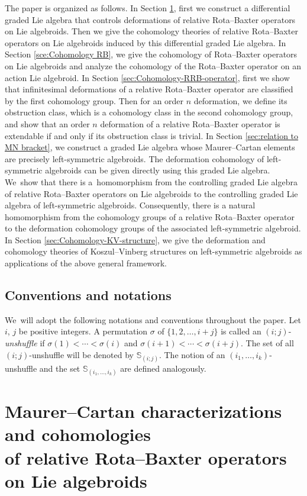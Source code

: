 \documentclass[pdftex]{sigma}%
\numberwithin{equation}{section}
\begin{document}
The paper is organized as follows.
In Section \ref{sec:MC-RRB-operator}, first we construct a differential graded Lie algebra that controls deformations of relative Rota--Baxter operators on Lie algebroids. Then we give the cohomology theories of relative Rota--Baxter operators on Lie algebroids induced by this differential graded Lie algebra. In Section \ref{sce:Cohomology RB}, we give the cohomology of Rota--Baxter operators on Lie algebroids and analyze the cohomology of the Rota--Baxter operator on an action Lie algebroid. In Section \ref{sec:Cohomology-RRB-operator}, first we show that infinitesimal deformations of a relative Rota--Baxter operator are classified by the first cohomology group. Then for an order $n$ deformation, we define its obstruction class, which is a cohomology class in the second cohomology group, and show that an order $n$ deformation of a relative Rota--Baxter operator is extendable if and only if its obstruction class is trivial.
In Section \ref{sec:relation to MN bracket}, we construct a graded Lie algebra whose Maurer--Cartan elements are precisely left-symmetric algebroids. The deformation cohomology of left-symmetric algebroids can be given directly using this graded Lie algebra. We~show that there is a~homomorphism from the controlling graded Lie algebra of relative Rota--Baxter operators on Lie algebroids to the controlling graded Lie algebra of left-symmetric algebroids. Consequently, there is a natural homomorphism from the cohomology groups of a relative Rota--Baxter operator to the deformation cohomology groups of the associated left-symmetric algebroid.
In Section \ref{sec:Cohomology-KV-structure}, we give the deformation and cohomology theories of Koszul--Vinberg structures on left-symmetric algebroids as applications of the above general framework.

\subsection{Conventions and notations}
We~will adopt the following notations and conventions throughout the paper.
Let $i$, $j$ be positive integers. A permutation $\sigma$ of $\{1,2,\dots,i+j\}$ is called an $(i;j)$-{\it unshuffle} if $\sigma(1)<\cdots<\sigma(i)$ and $\sigma(i+1)<\cdots<\sigma(i+j)$. The set of all $(i;j)$-unshuffle will be denoted by $\mathbb{S}_{(i;j)}$. The notion of an $(i_1,\dots,i_k)$-unshuffle and the set $\mathbb{S}_{(i_1,\dots,i_k)}$ are defined analogously.

\section[Maurer--Cartan characterizations and cohomologies of relative Rota--Baxter operators on Lie algebroids]
{Maurer--Cartan characterizations and cohomologies \\of relative Rota--Baxter operators on Lie algebroids}\label{sec:MC-RRB-operator}
\end{document}
